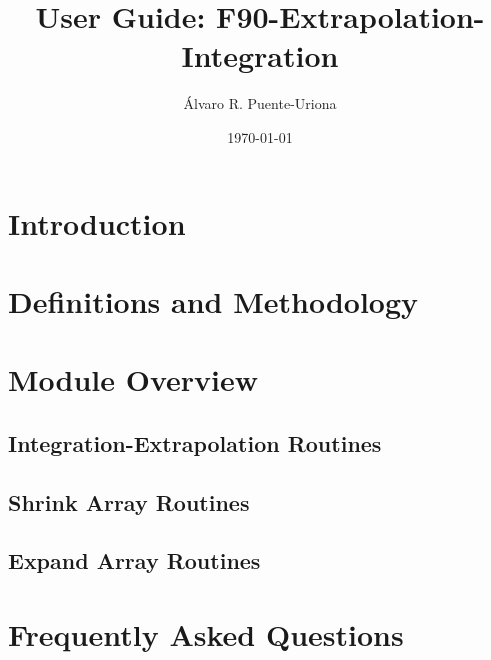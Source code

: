 \documentclass[12pt,a4paper]{article}
\title{User Guide: F90-Extrapolation-Integration}
\author{{\'A}lvaro R. Puente-Uriona}
\date{\today}
\begin{document}
\maketitle
\section{Introduction}

\section{Definitions and Methodology}

\section{Module Overview}

\subsection{Integration-Extrapolation Routines}
\subsection{Shrink Array Routines}
\subsection{Expand Array Routines}
\section{Frequently Asked Questions}


\end{document}
